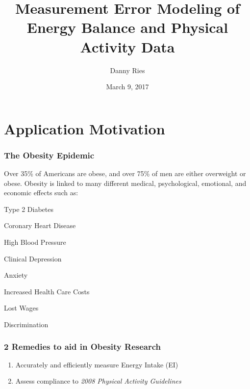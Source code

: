 \documentclass[handout]{beamer}\usepackage[]{graphicx}\usepackage[]{color}
\title{Measurement Error Modeling of Energy Balance and Physical Activity Data}
\author[Danny Ries]{Danny Ries}
\institute[Iowa State]{Iowa State University}
\date{March 9, 2017}
\begin{document}







\frame{\maketitle}

\section{Application Motivation}
\begin{frame}
\frametitle{The Obesity Epidemic}

Over 35\% of Americans are obese, and over  75\% of men are either overweight or obese. Obesity is linked to many different medical, psychological, emotional, and economic effects such as:
\begin{itemize}
\begin{multicols}{2}
\item
Type 2 Diabetes
\item
Coronary Heart Disease
\item
High Blood Pressure
\item 
Clinical Depression
\columnbreak
\item
Anxiety
\item 
Increased Health Care Costs
\item
Lost Wages
\item
Discrimination
\end{multicols}
\end{itemize}

\end{frame}






\begin{frame}
\frametitle{2 Remedies to aid in Obesity Research}
\begin{enumerate}
\item
Accurately and efficiently measure Energy Intake (EI)

\vspace{0.2cm}

\item
Assess compliance to \emph{2008 Physical Activity Guidelines}
\end{enumerate}



\end{frame}
\end{document}
